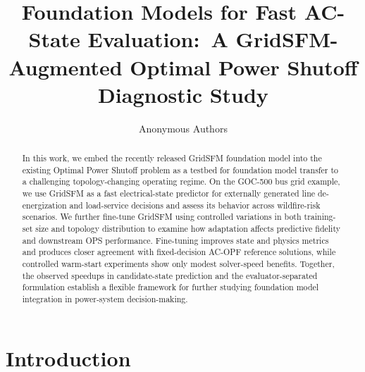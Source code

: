 \documentclass{article}
\title{Foundation Models for Fast AC-State Evaluation:\
A GridSFM-Augmented Optimal Power Shutoff Diagnostic Study}
\author{Anonymous Authors}
\newcommand{\fillin}[1]{\textcolor{red!70!black}{\textbf{[FILL: #1]}}}
\begin{document}
\maketitle

\begin{abstract}
In this work, we embed the recently released GridSFM foundation model into the existing Optimal Power Shutoff problem as a testbed for foundation model transfer to a challenging topology-changing operating regime. On the GOC-500 bus grid example, we use GridSFM as a fast electrical-state predictor for externally generated line de-energization and load-service decisions and assess its behavior across wildfire-risk scenarios. We further fine-tune GridSFM using controlled variations in both training-set size and topology distribution to examine how adaptation affects predictive fidelity and downstream OPS performance. Fine-tuning improves state and physics metrics and produces closer agreement with fixed-decision AC-OPF reference solutions, while controlled warm-start experiments show only modest solver-speed benefits. Together, the observed speedups in candidate-state prediction and the evaluator-separated formulation establish a flexible framework for further studying foundation model integration in power-system decision-making.

\end{abstract}

\section{Introduction}
\end{document}
